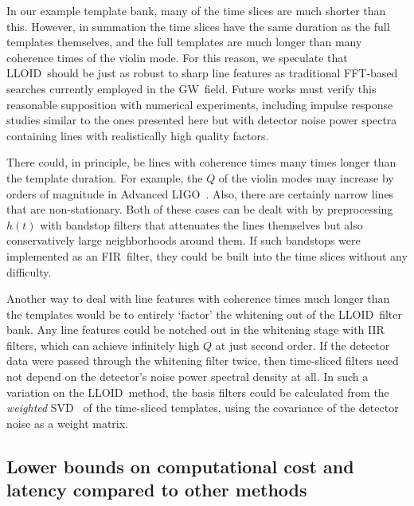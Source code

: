 \documentclass[preprint2]{aastex}
\newcommand{\GW}{GW}%
\newcommand{\LIGO}{LIGO}%
\newcommand{\SVD}{SVD}%
\newcommand{\fir}{FIR}%
\newcommand{\fft}{FFT}%
\newcommand{\lloid}{LLOID}%
\begin{document}
In our example template bank, many of the time slices are much shorter
than this.  However, in summation the time slices have the same duration as the full templates themselves, and the full templates are much longer than many
coherence times of the violin mode.  For this reason, we speculate that 
\lloid\ should be just as robust to sharp line features as
traditional \fft-based searches currently employed in the \GW\ field.  Future works must verify this reasonable supposition with numerical experiments, including impulse response studies similar to the ones presented here but with detector noise power spectra containing lines with realistically high quality factors.

There could, in principle, be lines with coherence times many times
longer than the template duration.  For example, the $Q$ of the violin
modes may increase by orders of magnitude in Advanced \LIGO~\citep{ALIGOSusp}.  Also,
there are certainly narrow lines that are non-stationary.  Both of these
cases can be dealt with by preprocessing $h(t)$ with bandstop filters
that attenuates the lines themselves but also conservatively large neighborhoods
around them.  If such bandstops were implemented as an \fir\ filter, they
could be built into the time slices without any difficulty.

Another way to deal with line features with coherence times much longer than the templates would be to entirely `factor' the whitening out of the \lloid\ filter bank.  Any line features could be notched out in the whitening stage with IIR filters, which can achieve infinitely high $Q$ at just second order.  If the detector data were passed through the whitening filter twice, then time-sliced filters need not depend on the detector's noise power spectral density at all.  In such a variation on the \lloid\ method, the basis filters could be calculated from the \emph{weighted} \SVD~\citep[chapter 3.6]{WeightedSVD, jackson2003user} of the time-sliced templates, using the covariance of the detector noise as a weight matrix.

\subsection{Lower bounds on computational cost and latency compared to other
methods}
\end{document}
